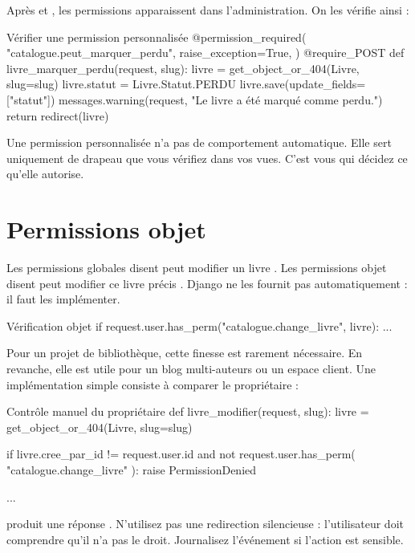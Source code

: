 Après  et , les permissions apparaissent dans
l'administration. On les vérifie ainsi :

\begin{codebox}[python]{Vérifier une permission personnalisée}
@permission_required(
    "catalogue.peut_marquer_perdu",
    raise_exception=True,
)
@require_POST
def livre_marquer_perdu(request, slug):
    livre = get_object_or_404(Livre, slug=slug)
    livre.statut = Livre.Statut.PERDU
    livre.save(update_fields=["statut"])
    messages.warning(request, "Le livre a été marqué comme perdu.")
    return redirect(livre)
\end{codebox}

\begin{note}
Une permission personnalisée n'a pas de comportement automatique. Elle sert
uniquement de drapeau que vous vérifiez dans vos vues. C'est vous qui décidez ce
qu'elle autorise.
\end{note}

\section{Permissions objet}

Les permissions globales disent \og peut modifier un livre \fg. Les permissions
objet disent \og peut modifier ce livre précis \fg. Django ne les fournit pas
automatiquement : il faut les implémenter.

\begin{codebox}[python]{Vérification objet}
if request.user.has_perm("catalogue.change_livre", livre):
    ...
\end{codebox}

Pour un projet de bibliothèque, cette finesse est rarement nécessaire. En revanche,
elle est utile pour un blog multi-auteurs ou un espace client. Une implémentation
simple consiste à comparer le propriétaire :

\begin{codebox}[python]{Contrôle manuel du propriétaire}
def livre_modifier(request, slug):
    livre = get_object_or_404(Livre, slug=slug)

    if livre.cree_par_id != request.user.id and not request.user.has_perm(
        "catalogue.change_livre"
    ):
        raise PermissionDenied

    ...
\end{codebox}

\begin{attention}
 produit une réponse . N'utilisez pas une
redirection silencieuse : l'utilisateur doit comprendre qu'il n'a pas le droit.
Journalisez l'événement si l'action est sensible.
\end{attention}

